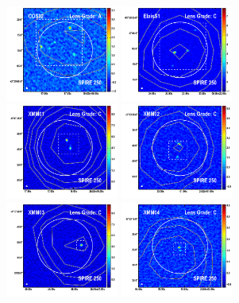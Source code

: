 \documentclass[iop]{emulateapj}
\begin{document}
\begin{figure}[!tbp] 
    \begin{centering}
\includegraphics[width=0.331\textwidth]{../Figures/overlays/COS02_870_250.pdf}
\includegraphics[width=0.331\textwidth]{../Figures/overlays/ElaisS1_870_250.pdf}
\includegraphics[width=0.331\textwidth]{../Figures/overlays/XMM01_870_250.pdf}
\includegraphics[width=0.331\textwidth]{../Figures/overlays/XMM02_870_250.pdf}
\includegraphics[width=0.331\textwidth]{../Figures/overlays/XMM03_870_250.pdf}
\includegraphics[width=0.331\textwidth]{../Figures/overlays/XMM04_870_250.pdf}

\end{centering}
\end{figure}
\end{document}
